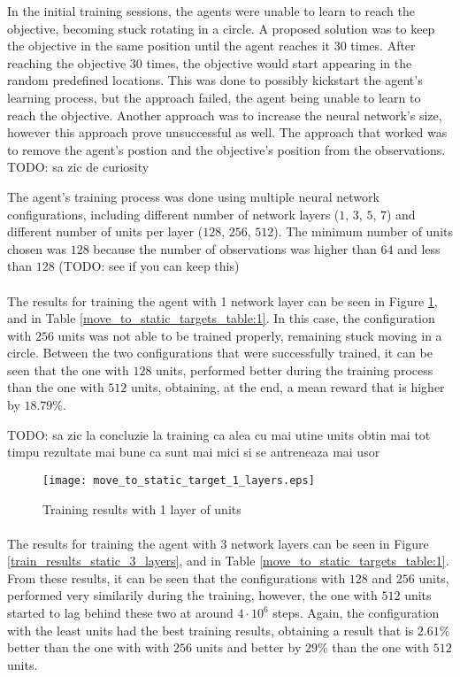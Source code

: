 In the initial training sessions, the agents were unable to learn to reach the objective, becoming stuck rotating in a circle. A proposed solution was to keep the objective in the same position until the agent reaches it 30 times. After reaching the objective 30 times, the objective would start appearing in the random predefined locations. This was done to possibly kickstart the agent's learning process, but the approach failed, the agent being unable to learn to reach the objective. Another approach was to increase the neural network's size, however this approach prove unsuccessful as well. The approach that worked was to remove the agent's postion and the objective's position from the observations. TODO: sa zic de curiosity

The agent's training process was done using multiple neural network configurations, including different number of network layers ($1$, $3$, $5$, $7$) and different number of units per layer ($128$, $256$, $512$). The minimum number of units chosen was $128$ because the number of observations was higher than $64$ and less than $128$ (TODO: see if you can keep this)

\paragraph{}
The results for training the agent with 1 network layer can be seen in Figure \ref{train_results_static_1_layers}, and in Table \ref{move_to_static_targets_table:1}. In this case, the configuration with $256$ units was not able to be trained properly, remaining stuck moving in a circle. Between the two configurations that were successfully trained, it can be seen that the one with $128$ units, performed better during the training process than the one with $512$ units, obtaining, at the end, a mean reward that is higher by $18.79\%$.


TODO: sa zic la concluzie la training ca alea cu mai utine units obtin mai tot timpu rezultate mai bune ca sunt mai mici si se antreneaza mai usor

\begin{figure}
    \begin{center}
        \texttt{[image: move\_to\_static\_target\_1\_layers.eps]}
        \caption{Training results with 1 layer of units}
        \label{train_results_static_1_layers}
    \end{center}
\end{figure}


\paragraph{}
The results for training the agent with 3 network layers can be seen in Figure \ref{train_results_static_3_layers}, and in Table \ref{move_to_static_targets_table:1}. From these results, it can be seen that the configurations with $128$ and $256$ units, performed very similarily during the training, however, the one with $512$ units started to lag behind these two at around $4 \cdot 10^6$ steps. Again, the configuration with the least units had the best training results, obtaining a result that is $2.61\%$ better than the one with with $256$ units and better by $29\%$ than the one with $512$ units. 

